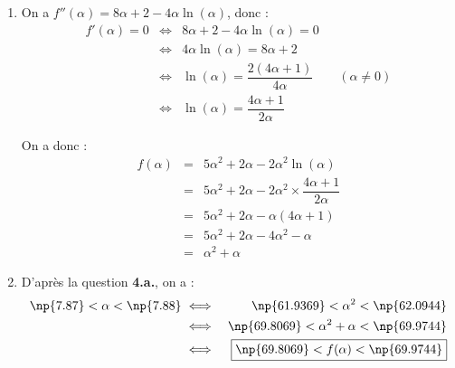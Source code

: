 \begin{enumerate}
\begin{enumerate}
		Au final, l'équation $f'(x) = 0$ admet une solution unique $\alpha$ sur $]0~;~+\infty[$.\\
		\medskip
		
		On a :
		\[\boxed{\np{7.87} < \alpha < \np{7.88}}\]
		\item On sait que sur $]0~;~\text{e}]$ on a $f'(x) > 0$. Puisque $f'$ est décroissante sur $[\text{e}~;~+\infty[$ et qu'elle s'annule en $\alpha$, $f'(x) \geqslant 0$ sur $[\text{e}~;~\alpha]$ et $f'(x) \leqslant 0$ sur $[\alpha~;~+\infty[$. Donc $f'(x)$ est positif sur $]0~;~\alpha]$ et négatif sur $[\alpha~;~+\infty[$.
		
		\begin{center}
		\end{center}
	\end{enumerate}
	\item On a $f''(\alpha) = 8\alpha + 2 - 4\alpha \ln(\alpha)$, donc :
	\begin{eqnarray*}
		f'(\alpha) = 0 &\iff& 8\alpha + 2 - 4 \alpha \ln(\alpha) = 0\\
		&\iff& 4\alpha\ln(\alpha) = 8\alpha + 2\\
		&\iff& \ln(\alpha) = \dfrac{2(4\alpha+1)}{4\alpha} \qquad (\alpha \neq 0)\\
		&\iff& \boxed{\ln(\alpha) = \dfrac{4\alpha+1}{2\alpha}}
	\end{eqnarray*}
	
	On a donc :
	\begin{eqnarray*}
		f(\alpha) &=& 5\alpha^2 + 2\alpha - 2\alpha^2 \ln(\alpha) \\
		&=& 5\alpha^2 + 2\alpha - 2\alpha^2 \times \dfrac{4\alpha+1}{2\alpha} \\
		&=& 5\alpha^2 + 2\alpha - \alpha(4\alpha + 1) \\
		&=& 5\alpha^2 + 2\alpha - 4\alpha^2 - \alpha \\
		&=& \boxed{\alpha^2  + \alpha}
	\end{eqnarray*}
	\item D'après la question \textbf{4.a.}, on a :
	\begin{eqnarray*}
		\np{7.87} < \alpha < \np{7.88} &\iff& \np{61.9369} < \alpha^2 < \np{62.0944} \\
		&\iff& \np{69.8069} < \alpha^2 + \alpha < \np{69.9744} \\
		&\iff& \boxed{\np{69.8069} < f(\alpha) < \np{69.9744}}
	\end{eqnarray*}
\end{enumerate}


